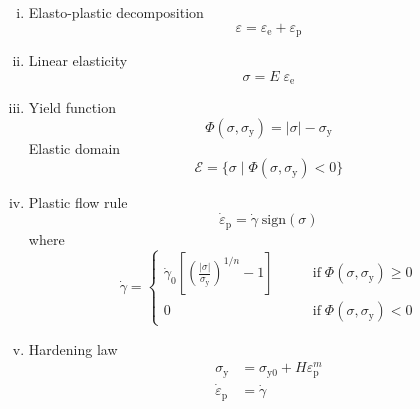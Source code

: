 \documentclass[times,namecite]{goose-article}
\begin{document}
\begin{enumerate}[(i)]
%
\item Elasto-plastic decomposition
\begin{equation}
  \varepsilon = \varepsilon_\mathrm{e} + \varepsilon_\mathrm{p}
\end{equation}
%
\item Linear elasticity
\begin{equation}
  \sigma = E \; \varepsilon_\mathrm{e}
\end{equation}
%
\item Yield function
\begin{equation}
  \Phi ( \sigma , \sigma_\mathrm{y} ) = | \sigma | - \sigma_\mathrm{y}
\end{equation}
Elastic domain
\begin{equation}
  \mathcal{E}
  = \big\{ \sigma \; \big| \; \Phi ( \sigma , \sigma_\mathrm{y} ) < 0 \big\}
\end{equation}
%
\item Plastic flow rule
\begin{equation}
  \dot{\varepsilon}_\mathrm{p} = \dot{\gamma} \; \mathrm{sign} ( \sigma )
\end{equation}
where
\begin{equation}
  \dot{\gamma}
  =
  \begin{cases}
    \displaystyle \dot{\gamma}_0
    \left[
      \left( \frac{| \sigma |}{\sigma_\mathrm{y}} \right)^{1/n} - 1
    \right] \qquad &
    \mathrm{if} \; \Phi ( \sigma , \sigma_\mathrm{y} ) \geq 0
    \\
    0 \qquad &
    \mathrm{if} \; \Phi ( \sigma , \sigma_\mathrm{y} ) <    0
  \end{cases}
\end{equation}
%
\item Hardening law
\begin{align}
  \sigma_\mathrm{y} &= \sigma_\mathrm{y0} + H \varepsilon_\mathrm{p}^m \\
  \dot{\varepsilon}_\mathrm{p} &= \dot{\gamma}
\end{align}
\end{enumerate}


\end{document}
